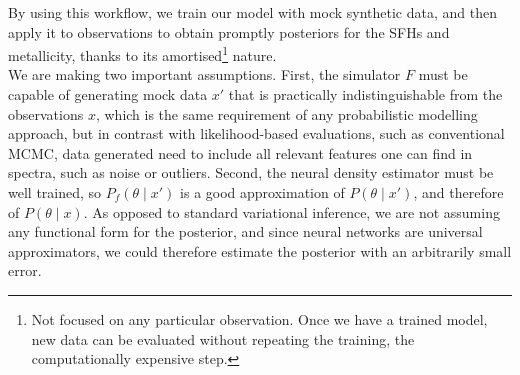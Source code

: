  By using this workflow, we train our model with mock synthetic data, and then apply it to observations to obtain promptly posteriors for the SFHs and metallicity, thanks to its amortised\footnote{Not focused on any particular observation. Once we have a trained model, new data can be evaluated without repeating the training, the computationally expensive step.} nature.\\
 
 We are making two important assumptions. First, the simulator $F$ must be capable of generating mock data $x'$ that is practically indistinguishable from the observations $x$, which is the same requirement of any probabilistic modelling approach, but in contrast with likelihood-based evaluations, such as conventional MCMC, data generated need to include all relevant features one can find in spectra, such as noise or outliers. Second, the neural density estimator must be well trained, so  $P_f(\theta \mid x')$ is a good approximation of $P(\theta \mid x')$, and therefore of $P(\theta \mid x)$. As opposed to standard variational inference, we are not assuming any functional form for the posterior, and since neural networks are universal approximators, we could therefore estimate the posterior with an arbitrarily small error.\\


